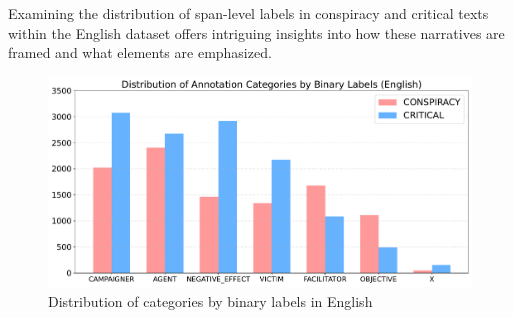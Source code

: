 \documentclass{Configuration_Files/PoliMi3i_thesis}
\begin{document}
Examining the distribution of span-level labels in conspiracy and critical texts within the English dataset offers intriguing insights into how these narratives are framed and what elements are emphasized.

\label{subsec:in_depth_analysis_en}
\begin{figure}[H]
 \centering
 \includegraphics[width=0.95\linewidth]{Images/grouped_chart_en_v2.pdf}
 \caption{Distribution of categories by binary labels in English}
 \label{fig:grouped_chart_en}
\end{figure}
\FloatBarrier
\end{document}
